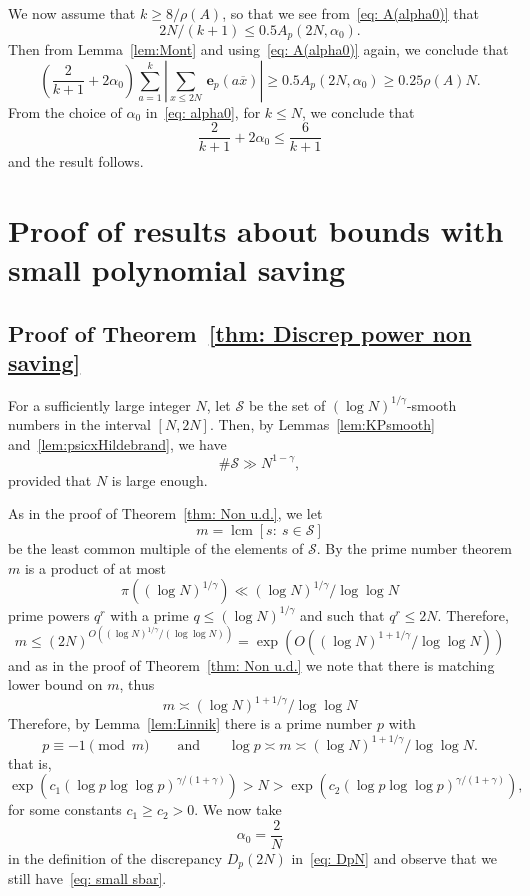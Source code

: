 \documentclass[12pt]{amsart}
\numberwithin{equation}{section}
\numberwithin{theorem}{section}
\numberwithin{table}{section}
\numberwithin{figure}{section}
\def\cS{{\mathcal S}}
\def\le{\leqslant}
\def\ge{\geqslant}
\def\e{\mathbf{e}}
\def\xbar{\overline{x}}
\def\mand{\qquad\mbox{and}\qquad}
\def\({\left(}
\def\){\right)}
\def\e{{\mathbf{\,e}}}
\newcommand{\lcm}{\operatorname{lcm}}
\begin{document}
We now assume that $k\ge  8/\rho(A)$, so that  we see from~\eqref{eq: A(alpha0)} that 
$$
2N/(k+1) \le 0.5  A_p(2N, \alpha_0).
$$ 
Then from Lemma~\ref{lem:Mont} and  using~\eqref{eq: A(alpha0)} again, we conclude that 
$$
  \(\frac{2}{k+1}+2\alpha_0\)  \sum_{a=1}^k\left|\sum_{x\le 2N}\e_p(a\xbar)\right|\ge 
   0.5  A_p(2N, \alpha_0)  \ge 0.25  \rho(A) N.
$$
From the choice of $\alpha_0$  in~\eqref{eq: alpha0}, for  $k \le N$, we conclude that
$$
  \frac{2}{k+1}+2\alpha_0 \le   \frac{6}{k+1}
$$ 
and the result follows. 



\section{Proof of  results about bounds with small polynomial saving}

\subsection{Proof of  Theorem~\ref{thm: Discrep power non saving}}
For a sufficiently large integer $N$, let $\cS$ be the set  of $(\log N)^{1/\gamma}$-smooth numbers in the interval $[N, 2N]$. 
Then, by Lemmas~\ref{lem:KPsmooth} and~\ref{lem:psicxHildebrand}, we have 
\begin{equation}
\label{eq: again Set S}
\# \cS\gg  N^{1-\gamma} , 
\end{equation}
provided that $N$ is large enough. 

As in the proof of Theorem~\ref{thm: Non u.d.}, we let  
$$
m = \lcm[s:~s \in \cS]
$$
be the least common multiple of the elements of $\cS$.  By the prime number theorem $m$ is a 
product of at most 
$$
\pi\((\log N)^{1/\gamma}\) \ll (\log N)^{1/\gamma}/\log\log N
$$
prime powers $q^r$ with a prime $q\le (\log N)^{1/\gamma}$ and such that $q^r\le 2N$. 
Therefore, 
$$
m \le (2N)^{O\((\log N)^{1/\gamma}/(\log \log N)\)} =  \exp\(O\(\(\log N\)^{1+1/\gamma}/\log\log N\)\)
$$
and as in the proof of Theorem~\ref{thm: Non u.d.} we note that there is matching lower bound on $m$, thus 
$$
 m   \asymp \(\log N\)^{1+1/\gamma}/\log\log N
$$  
Therefore, by  Lemma~\ref{lem:Linnik} there is a prime number $p$ with 
$$
p \equiv - 1 \pmod m \mand  \log p \asymp m  \asymp \(\log N\)^{1+1/\gamma}/\log\log N. 
$$
that is,
$$
\exp\(c_1(\log p\log\log p)^{\gamma/(1+\gamma)}\) > N > \exp\(c_2(\log p\log\log p)^{\gamma/(1+\gamma)}\),
$$
for some constants $c_1\ge c_2 >0$. 
We now take 
$$
\alpha_0 = \frac{2}{N}
$$
in the definition of the discrepancy $D_p(2N)$ in~\eqref{eq: DpN} and observe 
that we still have~\eqref{eq: small sbar}. 
\end{document}
